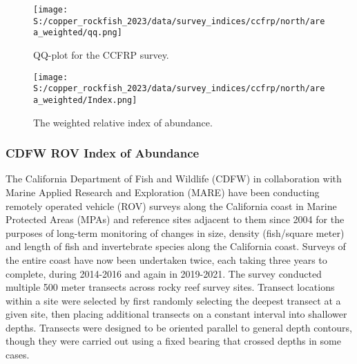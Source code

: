 \documentclass[11pt,
  english,
  letterpaper,
]{article}
\begin{document}
\newpage

\begin{figure}
\centering
\texttt{[image: S:/copper\_rockfish\_2023/data/survey\_indices/ccfrp/north/area\_weighted/qq.png]}
\caption{QQ-plot for the CCFRP survey.\label{fig:ccfrp-qq}}
\end{figure}

\newpage

\begin{figure}
\centering
\texttt{[image: S:/copper\_rockfish\_2023/data/survey\_indices/ccfrp/north/area\_weighted/Index.png]}
\caption{The weighted relative index of abundance.\label{fig:ccfrp-index}}
\end{figure}

\hypertarget{cdfw-rov-index}{%
\subsubsection{CDFW ROV Index of Abundance}\label{cdfw-rov-index}}

The California Department of Fish and Wildlife (CDFW) in collaboration with Marine Applied Research and Exploration (MARE) have been conducting remotely operated vehicle (ROV) surveys along the California coast in Marine Protected Areas (MPAs) and reference sites adjacent to them since 2004 for the purposes of long-term monitoring of changes in size, density (fish/square meter) and length of fish and invertebrate species along the California coast. Surveys of the entire coast have now been undertaken twice, each taking three years to complete, during 2014-2016 and again in 2019-2021. The survey conducted multiple 500 meter transects across rocky reef survey sites. Transect locations within a site were selected by first randomly selecting the deepest transect at a given site, then placing additional transects on a constant interval into shallower depths. Transects were designed to be oriented parallel to general depth contours, though they were carried out using a fixed bearing that crossed depths in some cases.
\end{document}
